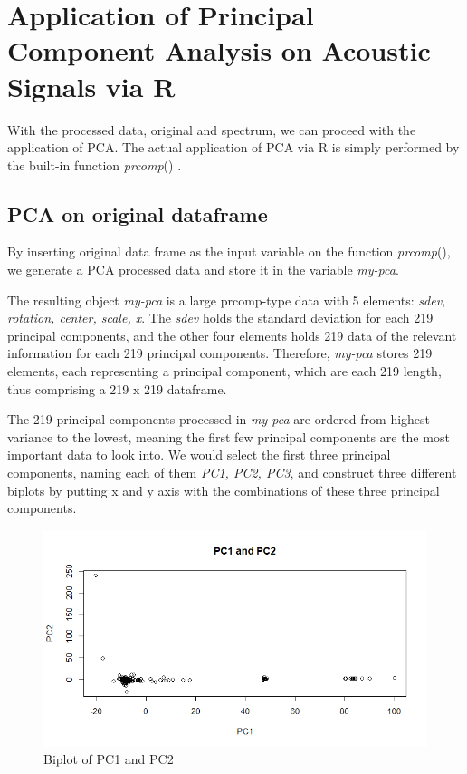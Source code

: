 \section{Application of Principal Component Analysis on Acoustic Signals via R}


With the processed data, original and spectrum, we can proceed with the application of PCA. The actual application of PCA via R is simply performed by the built-in function \emph{prcomp}() \cite{Chazal}.


\subsection{PCA on original dataframe}


By inserting original data frame as the input variable on the function \emph{prcomp}(), we generate a PCA processed data and store it in the variable \emph{my-pca}. 

The resulting object \emph{my-pca} is a large prcomp-type data with 5 elements: \emph{sdev, rotation, center, scale, x}. The \emph{sdev} holds the standard deviation for each 219 principal components, and the other four elements holds 219 data of the relevant information for each 219 principal components. Therefore, \emph{my-pca} stores 219 elements, each representing a principal component, which are each 219 length, thus comprising a 219 x 219 dataframe.

The 219 principal components processed in \emph{my-pca} are ordered from highest variance to the lowest, meaning the first few principal components are the most important data to look into. We would select the first three principal components, naming each of them \emph{PC1, PC2, PC3}, and construct three different biplots by putting x and y axis with the combinations of these three principal components.

\begin{figure}[H]
    \centering
    \includegraphics[width=12cm]{images/PCA/PC1 and PC2.png}   
    \caption{Biplot of PC1 and PC2}
    \label{fig:PCA12biplot} 
\end{figure}

